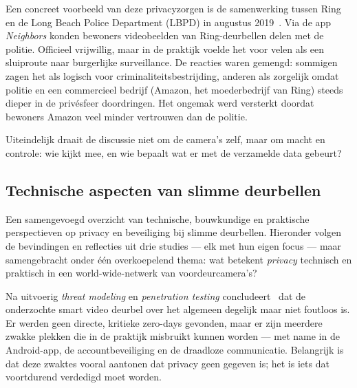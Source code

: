 \documentclass[nonacm, sigconf]{acmart}
\begin{document}
    Een concreet voorbeeld van deze privacyzorgen is de samenwerking tussen Ring en de Long Beach Police Department (LBPD) in augustus 2019~\parencite{shaffer2021applying}.
    Via de app \textit{Neighbors} konden bewoners videobeelden van Ring-deurbellen delen met de politie.
    Officieel vrijwillig, maar in de praktijk voelde het voor velen als een sluiproute naar burgerlijke surveillance.
    De reacties waren gemengd: sommigen zagen het als logisch voor criminaliteitsbestrijding, anderen als zorgelijk omdat politie en een commercieel bedrijf (Amazon, het moederbedrijf van Ring) steeds dieper in de privésfeer doordringen.
    Het ongemak werd versterkt doordat bewoners Amazon veel minder vertrouwen dan de politie.

    Uiteindelijk draait de discussie niet om de camera's zelf, maar om macht en controle: wie kijkt mee, en wie bepaalt wat er met de verzamelde data gebeurt?

    \subsection{Technische aspecten van slimme deurbellen}
    Een samengevoegd overzicht van technische, bouwkundige en praktische perspectieven op privacy en beveiliging bij slimme deurbellen. Hieronder volgen de bevindingen en reflecties uit drie studies — elk met hun eigen focus — maar samengebracht onder één overkoepelend thema: wat betekent \emph{privacy} technisch en praktisch in een world-wide-netwerk van voordeurcamera's?


    Na uitvoerig \textit{threat modeling} en \textit{penetration testing} concludeert~\parencite{liu2021ethical} dat de onderzochte smart video deurbel over het algemeen degelijk maar niet foutloos is. Er werden geen directe, kritieke zero-days gevonden, maar er zijn meerdere zwakke plekken die in de praktijk misbruikt kunnen worden — met name in de Android-app, de accountbeveiliging en de draadloze communicatie. Belangrijk is dat deze zwaktes vooral aantonen dat privacy geen gegeven is; het is iets dat voortdurend verdedigd moet worden.
\end{document}
